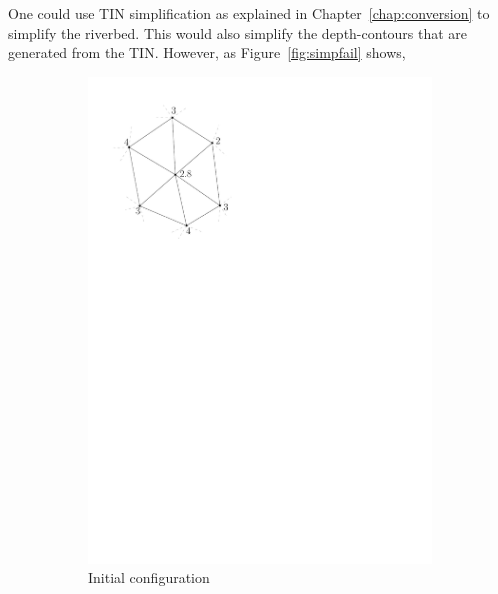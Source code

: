 One could use TIN simplification as explained in Chapter~\ref{chap:conversion} to simplify the riverbed.
This would also simplify the depth-contours that are generated from the TIN. 
However, as Figure~\ref{fig:simpfail} shows, 
\begin{figure}
\centering
  \begin{subfigure}[b]{0.2\linewidth}
    \centering
    \includegraphics[width=\textwidth,page=1]{figs/simpfail.pdf}
    \caption{Initial configuration}\label{fig:simpfail:a}
  \end{subfigure}
  \qquad
  \begin{subfigure}[b]{0.2\linewidth}
    \centering

\end{subfigure}
\end{figure}
